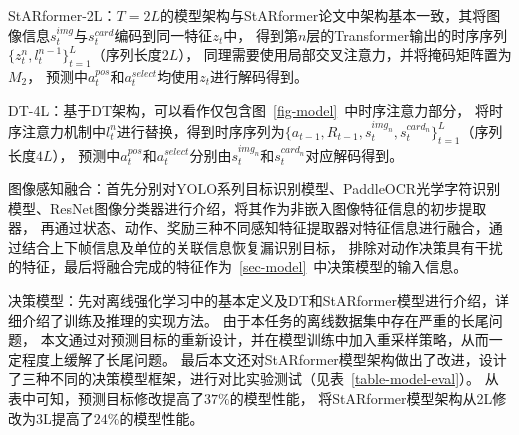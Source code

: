 StARformer-2L：$T=2L$的模型架构与StARformer论文中架构基本一致，其将图像信息$s_{t}^{img}$与$s_{t}^{card}$编码到同一特征$z_t$中，
得到第$n$层的Transformer输出的时序序列$\{z_t^{n}, l_{t}^{n-1}\}_{t=1}^{L}$（序列长度$2L$），
同理需要使用局部交叉注意力，并将掩码矩阵置为$M_2$，
预测中$a_{t}^{pos}$和$a_{t}^{select}$均使用$z_t$进行解码得到。

DT-4L：基于DT架构，可以看作仅包含图~\ref{fig-model}~中时序注意力部分，
将时序注意力机制中$l_t^{n}$进行替换，得到时序序列为$\{a_{t-1},R_{t-1},s_{t}^{img_n}, s_{t}^{card_n}\}_{t=1}^{L}$（序列长度$4L$），
预测中$a_{t}^{pos}$和$a_{t}^{select}$分别由$s_{t}^{img_n}$和$s_{t}^{card_n}$对应解码得到。

% 
图像感知融合：首先分别对YOLO系列目标识别模型、PaddleOCR光学字符识别模型、ResNet图像分类器进行介绍，将其作为非嵌入图像特征信息的初步提取器，
再通过状态、动作、奖励三种不同感知特征提取器对特征信息进行融合，通过结合上下帧信息及单位的关联信息恢复漏识别目标，
排除对动作决策具有干扰的特征，最后将融合完成的特征作为~\ref{sec-model}~中决策模型的输入信息。

决策模型：先对离线强化学习中的基本定义及DT和StARformer模型进行介绍，详细介绍了训练及推理的实现方法。
由于本任务的离线数据集中存在严重的长尾问题，
本文通过对预测目标的重新设计，并在模型训练中加入重采样策略，从而一定程度上缓解了长尾问题。
最后本文还对StARformer模型架构做出了改进，设计了三种不同的决策模型框架，进行对比实验测试（见表~\ref{table-model-eval}）。
从表中可知，预测目标修改提高了$37\%$的模型性能，
将StARformer模型架构从2L修改为3L提高了$24\%$的模型性能。
